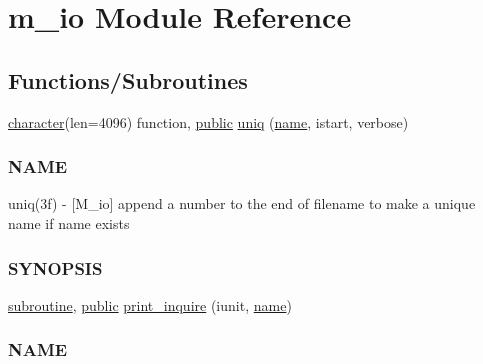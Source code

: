 \hypertarget{namespacem__io}{}\section{m\+\_\+io Module Reference}
\label{namespacem__io}
\subsection*{Functions/\+Subroutines}
\begin{DoxyCompactItemize}
\item 
\hyperlink{option__stopwatch_83_8txt_abd4b21fbbd175834027b5224bfe97e66}{character}(len=4096) function, \hyperlink{M__stopwatch_83_8txt_a2f74811300c361e53b430611a7d1769f}{public} \hyperlink{namespacem__io_a13a76a3cca012978c1d9c5c0c8b4a7ef}{uniq} (\hyperlink{M__stopwatch_83_8txt_a3f508a893ae4c3b397b4383e33b9bcae}{name}, istart, verbose)
\begin{DoxyCompactList}\small\item\em \subsubsection*{N\+A\+ME}

uniq(3f) -\/ \mbox{[}M\+\_\+io\mbox{]} append a number to the end of filename to make a unique name if name exists \subsubsection*{S\+Y\+N\+O\+P\+S\+IS}\end{DoxyCompactList}\item 
\hyperlink{M__stopwatch_83_8txt_acfbcff50169d691ff02d4a123ed70482}{subroutine}, \hyperlink{M__stopwatch_83_8txt_a2f74811300c361e53b430611a7d1769f}{public} \hyperlink{namespacem__io_aa6ee277b2e0f1c263488624b34371fcf}{print\+\_\+inquire} (iunit, \hyperlink{M__stopwatch_83_8txt_a3f508a893ae4c3b397b4383e33b9bcae}{name})
\begin{DoxyCompactList}\small\item\em \subsubsection*{N\+A\+ME}


\end{DoxyCompactList}
\end{DoxyCompactItemize}
